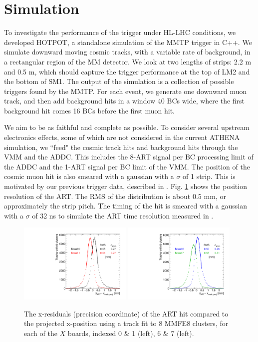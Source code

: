 \section{Simulation}
\label{sec:sim}

To investigate the performance of the trigger under HL-LHC conditions, we developed HOTPOT, a standalone simulation of the MMTP trigger in C++. We simulate downward moving cosmic tracks, with a variable rate of background, in a rectangular region of the MM detector. We look at two lengths of strips: 2.2 m and 0.5 m, which should capture the trigger performance at the top of LM2 and the bottom of SM1. The output of the simulation is a collection of possible triggers found by the MMTP. For each event, we generate one downward muon track, and then add background hits in a window 40 BCs wide, where the first background hit comes 16 BCs before the first muon hit.
\par We aim to be as faithful and complete as possible. To consider several upstream electronics effects, some of which are not considered in the current ATHENA simulation, we ``feed" the cosmic track hits and background hits through the VMM and the ADDC. This includes the 8-ART signal per BC processing limit of the ADDC and the 1-ART signal per BC limit of the VMM. The position of the cosmic muon hit is also smeared with a gaussian with a $\sigma$ of 1 strip. This is motivated by our previous trigger data, described in \cite{mmtp}. Fig. \ref{fig:art_xres} shows the position resolution of the ART. The RMS of the distribution is about 0.5 mm, or approximately the strip pitch. The timing of the hit is smeared with a gaussian with a $\sigma$ of 32 ns to simulate the ART time resolution measured in \cite{mmtp}.
\begin{figure}[!htpb]
  \begin{center}
    \includegraphics[width=0.48\textwidth]{figures/xres_art_boards01.pdf}
    \includegraphics[width=0.48\textwidth]{figures/xres_art_boards67.pdf}
  \end{center}
  \vspace{-10pt}
  \caption{The x-residuals (precision coordinate) of the ART hit compared to the projected x-position using a track fit to 8 MMFE8 clusters, for each of the $X$ boards, indexed 0 \& 1 (left), 6 \& 7 (left).}
  \label{fig:art_xres}
\end{figure}

